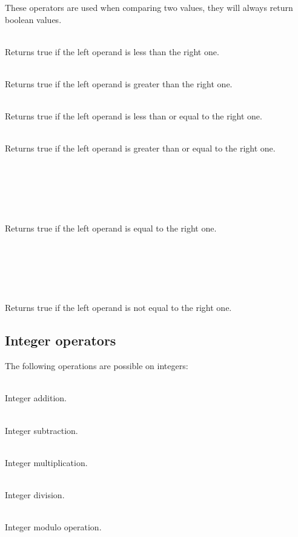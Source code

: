 These operators are used when comparing two values, they will always return
boolean values.
\begin{dlist}
  \item {}\\
    Returns true if the left operand is less than the right one.
  \item {}\\
    Returns true if the left operand is greater than the right one.
  \item {}\\
    Returns true if the left operand is less than or equal to the right one.
  \item {}\\
    Returns true if the left operand is greater than or equal to the right one.
  \item {}\\
    \\
    \\
    \\
    \\
    Returns true if the left operand is equal to the right one.
  \item {}\\
    \\
    \\
    \\
    \\
    Returns true if the left operand is not equal to the right one.
\end{dlist}

\subsection{Integer operators}

The following operations are possible on integers:
\begin{dlist}
  \item {} \\
    Integer addition.
  \item {} \\
    Integer subtraction.
  \item {} \\
    Integer multiplication.
  \item {} \\
    Integer division.
  \item {} \\
    Integer modulo operation.
\end{dlist}

